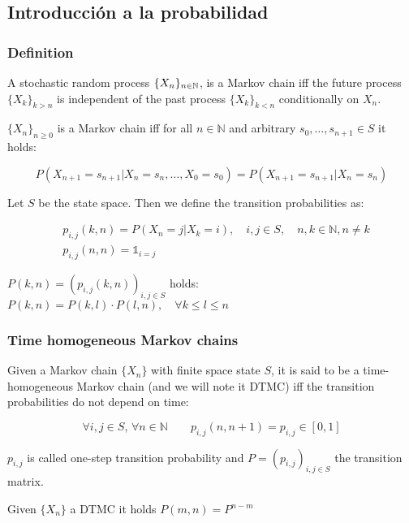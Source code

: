 \subsection{Introducción a la probabilidad}
 \begin{frame}\frametitle{Definition}
    \vspace{1em}
    \begin{definition}
    A stochastic random process \(\{X_n\}_{n\in \mathbb{N}}\), is a Markov chain iff the 
    future process \(\{X_k\}_{k > n}\) is independent of the past process 
    \(\{X_k\}_{k < n}\) conditionally on \(X_n\).
    \end{definition}

    \begin{lemma}
    \(\{X_n\}_{n \ge 0}\) is a Markov chain iff for all \(n\in\mathbb{N}\) and 
    arbitrary \(s_0, \ldots, s_{n + 1} \in S\) it holds:

    \[
    P(X_{n + 1} = s_{n + 1} | X_n = s_n, \ldots, X_0 = s_0) = P(X_{n + 1} = s_{n + 1} | X_n = s_n)
    \]
    \end{lemma}
    
    \begin{definition}
    Let \(S\) be the state space. Then we define the transition probabilities as:

    \begin{align*}
    & p_{i, j}(k, n) = P(X_n = j | X_k = i),\quad i,j \in S, \quad n,k \in \mathbb{N}, n\neq k \\
    & p_{i, j}(n, n) = \mathds{1}_{i = j}
    \end{align*}
    \end{definition}
    
    \begin{proposition}
    \(P(k, n) = (p_{i, j}(k, n))_{i,j \in S}\) holds:
    \(P(k, n) = P(k, l) \cdot P(l, n), \quad \forall k \le l \le n
    \)
    \end{proposition}

 \end{frame}
 
 \begin{frame} \frametitle{Time homogeneous Markov chains}
    \begin{definition}
    Given a Markov chain \(\{X_n\}\) with finite space state \(S\), it is said to be a 
    time-homogeneous Markov chain (and we will note it DTMC) iff the transition 
    probabilities do not depend on time:

    \[
    \forall i, j\in S, \,\forall n \in \mathbb{N} \qquad p_{i, j} (n, n + 1) = p_{i, j} \in [0, 1]
    \]

    \(p_{i, j}\) is called one-step transition probability and \(P = (p_{i, j})_{i, j \in S}\) the transition matrix.
    \end{definition}

    \begin{proposition}
    Given \(\{X_n\}\) a DTMC it holds \(P(m, n) = P^{n - m}\)
    \end{proposition}
 \end{frame}
